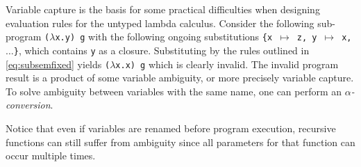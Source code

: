 \documentclass[11pt,oneside,a4paper]{report}
\begin{document}
\begin{exmp}
\begin{figure}[ht]
\begin{mdframed}
\begin{subfigure}[b]{1\textwidth}
\begin{prooftree}
        \end{prooftree}
        \caption{}
        \label{fig:rules:exmp:right}
      \end{subfigure}
        \vspace*{0.49cm}
      \begin{subfigure}[b]{1\textwidth}
        \begin{prooftree}
        \end{prooftree}
      \end{subfigure}
    \end{mdframed}
    \caption{}
    \label{fig:rules:exmp:sol}
  \end{figure}
\end{exmp}

Variable capture is the basis for some practical difficulties when designing evaluation rules for the untyped lambda calculus.
Consider the following sub-program \texttt{($\lambda$x.y) g} with the following ongoing substitutions \texttt{\{x $\mapsto$ z, y $\mapsto$ x, $\dots$\}}, which contains \texttt{y} as a closure.
Substituting by the rules outlined in \autoref{eq:subsemfixed} yields \texttt{($\lambda$x.x) g} which is clearly invalid.
The invalid program result is a product of some variable ambiguity, or more precisely variable capture.
To solve ambiguity between variables with the same name, one can perform an \textit{$\alpha$-conversion}.
\begin{remark}
  Notice that even if variables are renamed before program execution, recursive functions can still suffer from ambiguity since all parameters for that function can occur multiple times.
\end{remark}
\end{document}
